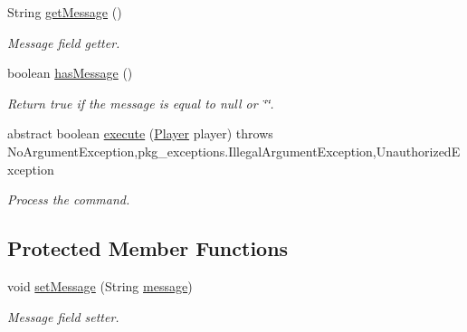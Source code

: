 \begin{DoxyCompactItemize}
String \hyperlink{classpkg__commands_1_1Command_ac2a42e2bab264821892daefaf9a18b6c}{get\-Message} ()
\begin{DoxyCompactList}\small\item\em Message field getter. \end{DoxyCompactList}\item 
boolean \hyperlink{classpkg__commands_1_1Command_ae46bb048d0fa705a5037a5204b530da2}{has\-Message} ()
\begin{DoxyCompactList}\small\item\em Return true if the message is equal to null or \char`\"{}\char`\"{}. \end{DoxyCompactList}\item 
abstract boolean \hyperlink{classpkg__commands_1_1Command_a19008923c75a87c87d1f3ba8bf8be43f}{execute} (\hyperlink{classpkg__world_1_1Player}{Player} player)  throws No\-Argument\-Exception,pkg\-\_\-exceptions.\-Illegal\-Argument\-Exception,\-Unauthorized\-Exception
\begin{DoxyCompactList}\small\item\em Process the command. \end{DoxyCompactList}\end{DoxyCompactItemize}
\subsection*{Protected Member Functions}
\begin{DoxyCompactItemize}
\item 
void \hyperlink{classpkg__commands_1_1Command_ae210ff216fe908b111ba1c988a963d13}{set\-Message} (String \hyperlink{classpkg__commands_1_1Command_ab4bc9d76fd948fcf253400793fbfde3f}{message})
\begin{DoxyCompactList}\small\item\em Message field setter. \end{DoxyCompactList}\end{DoxyCompactItemize}
